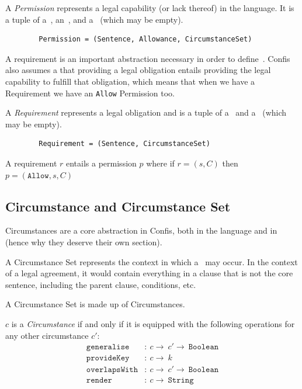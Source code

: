\begin{definition}[Permission]
    \label{def:permission} A \emph{Permission} represents a legal capability (or lack thereof) in the language.
    It is a tuple of a~, an~, and a~ (which may be empty).
    \begin{verbatim}
        Permission = (Sentence, Allowance, CircumstanceSet)
    \end{verbatim}
\end{definition}

A requirement is an important abstraction necessary in order to define~.
Confis also assumes a that providing a legal obligation entails providing the legal capability to fulfill that obligation, which means that when we have a Requirement we have an \texttt{Allow} Permission too.

\begin{definition}[Requirement]
    \label{def:requirement} A \emph{Requirement} represents a legal obligation and is a tuple of a~ and a~ (which may be empty).
    \begin{verbatim}
        Requirement = (Sentence, CircumstanceSet)
    \end{verbatim}

    A requirement $r$ entails a permission $p$ where if $r = (s, C)$ then $p = (\texttt{Allow}, s, C)$
\end{definition}

\subsection{Circumstance and Circumstance Set}\label{subsec:circumstance}

Circumstances are a core abstraction in Confis, both in the language and in~ (hence why they deserve their own section).

A Circumstance Set represents the context in which a~ may occur.
In the context of a legal agreement, it would contain everything in a clause that is not the core sentence, including the parent clause, conditions, etc.

A Circumstance Set is made up of Circumstances.


\begin{definition}[Circumstance]
    \label{def:circumstance}
    $c$ is a \emph{Circumstance} if and only if it is equipped with the following operations for any other circumstance $c'$:
    \begin{align}
        \label{def:c:generalise}
        \texttt{generalise}&: \ c \to\ c' \to\ \texttt{Boolean}\\
        \label{def:c:provideKey}
        \texttt{provideKey}&: \ c \to\ k\\
        \label{def:c:overlap}
        \texttt{overlapsWith}&:\ c \to\ c' \to\ \texttt{Boolean}\\
        \label{def:c:render}
        \texttt{render}&: \ c \to\ \texttt{String}
    \end{align}
\end{definition}

